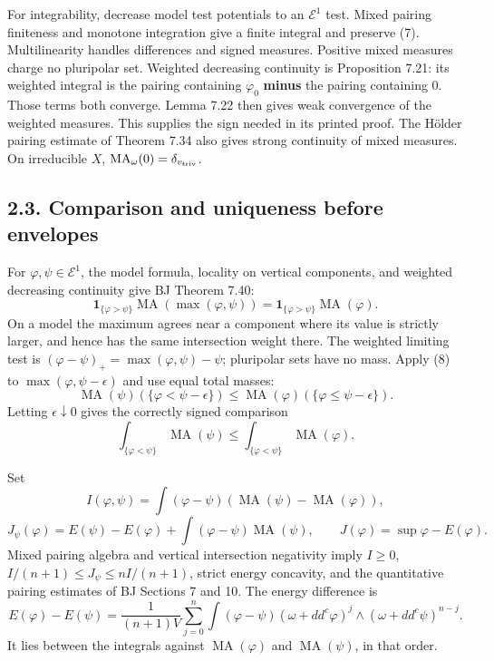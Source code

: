 \documentclass[
  11pt,
]{article}
\begin{document}
For integrability, decrease model test potentials to an \(\mathcal E^1\)
test. Mixed pairing finiteness and monotone integration give a finite
integral and preserve (7). Multilinearity handles differences and signed
measures. Positive mixed measures charge no pluripolar set. Weighted
decreasing continuity is Proposition 7.21: its weighted integral is the
pairing containing \(\varphi_0\) \textbf{minus} the pairing containing
\(0\). Those terms both converge. Lemma 7.22 then gives weak convergence
of the weighted measures. This supplies the sign needed in its printed
proof. The Hölder pairing estimate of Theorem 7.34 also gives strong
continuity of mixed measures. On irreducible \(X\),
\(\operatorname{MA}_\omega(0)=\delta_{v_{\rm triv}}\).

\subsection{2.3. Comparison and uniqueness before
envelopes}\label{comparison-and-uniqueness-before-envelopes}

For \(\varphi,\psi\in\mathcal E^1\), the model formula, locality on
vertical components, and weighted decreasing continuity give BJ Theorem
7.40: \[
 \mathbf1_{\{\varphi>\psi\}}\operatorname{MA}(\max(\varphi,\psi))
 =\mathbf1_{\{\varphi>\psi\}}\operatorname{MA}(\varphi).
 \tag{8}
\] On a model the maximum agrees near a component where its value is
strictly larger, and hence has the same intersection weight there. The
weighted limiting test is \((\varphi-\psi)_+=\max(\varphi,\psi)-\psi\);
pluripolar sets have no mass. Apply (8) to
\(\max(\varphi,\psi-\epsilon)\) and use equal total masses: \[
 \operatorname{MA}(\psi)(\{\varphi<\psi-\epsilon\})
 \leq\operatorname{MA}(\varphi)(\{\varphi\leq\psi-\epsilon\}).
\] Letting \(\epsilon\downarrow0\) gives the correctly signed comparison
\[\int_{\{\varphi<\psi\}}\operatorname{MA}(\psi)
 \leq\int_{\{\varphi<\psi\}}\operatorname{MA}(\varphi). \tag{9}\]

Set \[
 I(\varphi,\psi)=\int(\varphi-\psi)(\operatorname{MA}(\psi)-\operatorname{MA}(\varphi)),
\] \[
 J_\psi(\varphi)=E(\psi)-E(\varphi)+\int(\varphi-\psi)\operatorname{MA}(\psi),
 \qquad J(\varphi)=\sup\varphi-E(\varphi).
\] Mixed pairing algebra and vertical intersection negativity imply
\(I\geq0\), \(I/(n+1)\leq J_\psi\leq nI/(n+1)\), strict energy
concavity, and the quantitative pairing estimates of BJ Sections 7 and
10. The energy difference is \[
 E(\varphi)-E(\psi)=\frac1{(n+1)V}\sum_{j=0}^n
 \int(\varphi-\psi)(\omega+dd^c\varphi)^j\wedge(\omega+dd^c\psi)^{n-j}.
 \tag{10}
\] It lies between the integrals against \(\operatorname{MA}(\varphi)\)
and \(\operatorname{MA}(\psi)\), in that order.
\end{document}
